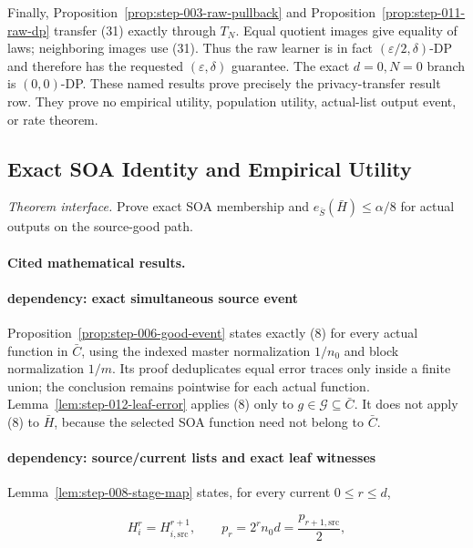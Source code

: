 Finally, Proposition~\ref{prop:step-003-raw-pullback} and
Proposition~\ref{prop:step-011-raw-dp} transfer (31) exactly through \(T_N\).
Equal quotient images give equality of laws; neighboring images use (31).
Thus the raw learner is in fact \((\varepsilon/2,\delta)\)-DP and therefore
has the requested \((\varepsilon,\delta)\) guarantee. The exact
\(d=0,N=0\) branch is \((0,0)\)-DP. These named results prove precisely the
 privacy-transfer result row. They prove no empirical utility, population
utility, actual-list output event, or rate theorem.



\subsection{Exact SOA Identity and Empirical Utility}\label{app:step_012}

\noindent\textit{Theorem interface.} Prove exact SOA membership and   \(e_{\bar S}(\bar H)\leq\alpha/8\) for actual outputs on the source-good   path.

\paragraph{Cited mathematical results.}


\paragraph{dependency: exact simultaneous source event}

Proposition~\ref{prop:step-006-good-event} states exactly (8) for
every actual function in \(\bar C\), using the indexed master normalization
\(1/n_0\) and block normalization \(1/m\). Its proof deduplicates equal
error traces only inside a finite union; the conclusion remains pointwise
for each actual function. Lemma~\ref{lem:step-012-leaf-error} applies (8)
only to \(g\in\mathcal G\subseteq\bar C\). It does not apply (8) to
\(\bar H\), because the selected SOA function need not belong to
\(\bar C\).

\paragraph{dependency: source/current lists and exact leaf witnesses}

Lemma~\ref{lem:step-008-stage-map} states, for every current
\(0\le r\le d\),

\[
 H_i^r=H_{i,\mathrm{src}}^{r+1},
 \qquad
 p_r=2^rn_0d=\frac{p_{r+1,\mathrm{src}}}{2},
\tag{12}
\]

